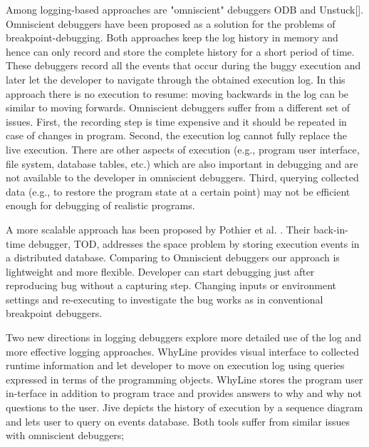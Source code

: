 \documentclass[preprint]{sigplanconf}
\begin{document}
Among logging-based approaches are "omniscient" debuggers ODB\cite{Lewis} and Unstuck[]. Omniscient debuggers have been proposed as a solution for the problems of breakpoint-debugging. Both approaches keep the log history in memory and hence can only record and store the complete history for a short period of time. These debuggers record all the events that occur during the buggy execution and later let the developer to navigate through the obtained execution log. In this approach there is no execution to resume: moving backwards in the log can be similar to moving forwards. Omniscient debuggers suffer from a different set of issues. First, the recording step is time expensive and it should be repeated in case of changes in program. Second, the execution log cannot fully replace the live execution. There are other aspects of execution (e.g., program user interface, file system, database tables, etc.) which are also important in debugging and are not available to the developer in omniscient debuggers. Third, querying collected data (e.g., to restore the program state at a certain point) may not be efficient enough for debugging of realistic programs.

A more scalable approach has been proposed by Pothier et al. \cite{Pothier}. Their back-in-time debugger, TOD, addresses the space problem by storing execution events in a distributed database. Comparing to Omniscient debuggers our approach is lightweight and more flexible. Developer can start debugging just after reproducing bug without a capturing step.  Changing inputs or environment settings and re-executing to investigate the bug works as in conventional breakpoint debuggers.

Two new directions in logging debuggers explore more detailed use of the log and more effective logging approaches. WhyLine\cite{Ko} provides visual interface to collected runtime information and let developer to move  on execution log using queries expressed in terms of the programming objects. WhyLine stores the program user in-terface in addition to program trace and provides answers to why and why not questions to the user. Jive\cite{Czyz} depicts the history of execution by a sequence diagram and lets user to query on events database. Both tools suffer from similar issues with omniscient debuggers; 
\end{document}
